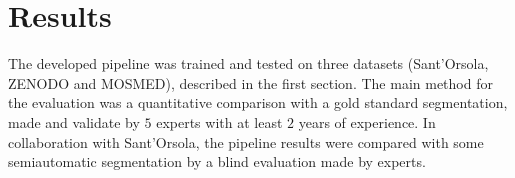 \documentclass{standalone}
\begin{document}
	\chapter{Results}
	

	
	The developed pipeline was trained and tested on three datasets (Sant'Orsola, ZENODO and MOSMED), described in the first section. 
	The main method for the evaluation was a quantitative comparison with a gold standard segmentation, made and validate by $5$ experts with at least $2$ years of experience. In collaboration with Sant'Orsola, the pipeline results were compared with some semiautomatic segmentation by a blind evaluation made by experts.
\end{document}
